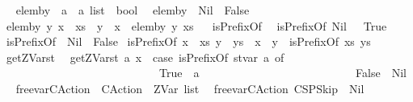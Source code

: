 \begin{isabellebody}
\isanewline
\ \isanewline
{}\isamarkupfalse%
\ elem{\isacharunderscore}by\ {\isacharcolon}{\isacharcolon}\ {\isachardoublequoteopen}{\isacharprime}a\ {\isasymRightarrow}\ {\isacharprime}a\ list\ {\isasymRightarrow}\ bool{\isachardoublequoteclose}\isanewline
{}\isanewline
\ \ {\isachardoublequoteopen}elem{\isacharunderscore}by\ {\isacharunderscore}\ Nil\ {\isacharequal}\ False{\isachardoublequoteclose}\isanewline
{\isacharbar}\ {\isachardoublequoteopen}elem{\isacharunderscore}by\ y\ {\isacharparenleft}x\ {\isacharhash}\ xs{\isacharparenright}\ {\isacharequal}\ {\isacharparenleft}y\ {\isacharequal}\ x\ {\isacharbar}\ elem{\isacharunderscore}by\ y\ xs{\isacharparenright}{\isachardoublequoteclose}\isanewline
\isanewline
\ \isanewline
{}\isamarkupfalse%
\ isPrefixOf\isanewline
{}\isanewline
\ \ {\isachardoublequoteopen}isPrefixOf\ Nil\ {\isacharunderscore}\ {\isacharequal}\ True{\isachardoublequoteclose}\isanewline
{\isacharbar}\ {\isachardoublequoteopen}isPrefixOf\ {\isacharunderscore}\ Nil\ {\isacharequal}\ False{\isachardoublequoteclose}\isanewline
{\isacharbar}\ {\isachardoublequoteopen}isPrefixOf\ {\isacharparenleft}x\ {\isacharhash}\ xs{\isacharparenright}\ {\isacharparenleft}y\ {\isacharhash}\ ys{\isacharparenright}\ {\isacharequal}\ {\isacharparenleft}x\ {\isacharequal}\ y\ {\isacharampersand}\ isPrefixOf\ xs\ ys{\isacharparenright}{\isachardoublequoteclose}\isanewline
\isanewline
\ \isanewline
{}\isamarkupfalse%
\ get{\isacharunderscore}ZVar{\isacharunderscore}st\isanewline
{}\isanewline
\ \ {\isachardoublequoteopen}get{\isacharunderscore}ZVar{\isacharunderscore}st\ {\isacharparenleft}a{\isacharcomma}\ x{\isacharparenright}\ {\isacharequal}\ {\isacharparenleft}case\ {\isacharparenleft}isPrefixOf\ {\isacharprime}{\isacharprime}st{\isacharunderscore}var{\isacharunderscore}{\isacharprime}{\isacharprime}\ a{\isacharparenright}\ of\isanewline
\ \ \ \ \ \ \ \ \ \ \ \ \ \ \ \ \ \ \ \ \ \ \ \ \ \ \ \ True\ {\isasymRightarrow}\ {\isacharbrackleft}a{\isacharbrackright}\isanewline
\ \ \ \ \ \ \ \ \ \ \ \ \ \ \ \ \ \ \ \ \ \ \ \ \ \ {\isacharbar}\ False\ {\isasymRightarrow}\ Nil{\isacharparenright}{\isachardoublequoteclose}\isanewline
\isanewline
\ \isanewline
{}\isamarkupfalse%
\ free{\isacharunderscore}var{\isacharunderscore}CAction\ {\isacharcolon}{\isacharcolon}\ {\isachardoublequoteopen}CAction\ {\isasymRightarrow}\ ZVar\ list{\isachardoublequoteclose}\isanewline
{}\isanewline
\ \ {\isachardoublequoteopen}free{\isacharunderscore}var{\isacharunderscore}CAction\ CSPSkip\ {\isacharequal}\ Nil{\isachardoublequoteclose}\isanewline

\end{isabellebody}
